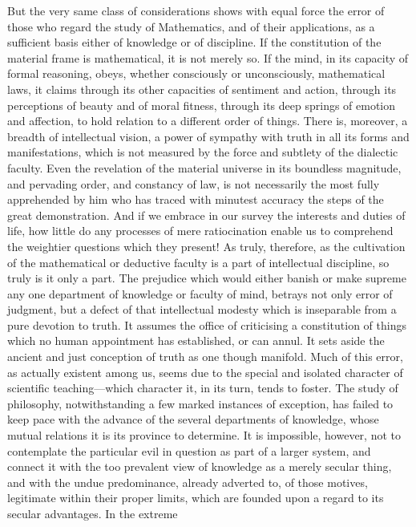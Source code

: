 \documentclass[oneside]{book}
\begin{document}
But the very same class of considerations shows with equal
force the error of those who regard the study of Mathematics,
and of their applications, as a sufficient basis either of knowledge
or of discipline. If the constitution of the material frame is mathematical, it is not merely so. If the mind, in its capacity of
formal reasoning, obeys, whether consciously or unconsciously,
mathematical laws, it claims through its other capacities of sentiment and action, through its perceptions of beauty and of
moral fitness, through its deep springs of emotion and affection,
to hold relation to a different order of things. There is, moreover, a breadth of intellectual vision, a power of sympathy with
truth in all its forms and manifestations, which is not measured
by the force and subtlety of the dialectic faculty. Even the
revelation of the material universe in its boundless magnitude,
and pervading order, and constancy of law, is not necessarily the
most fully apprehended by him who has traced with minutest
accuracy the steps of the great demonstration. And if we embrace in our survey the interests and duties of life, how little do
any processes of mere ratiocination enable us to comprehend the
weightier questions which they present! As truly, therefore, as
the cultivation of the mathematical or deductive faculty is a part
of intellectual discipline, so truly is it only a part. The prejudice which would either banish or make supreme any one
department of knowledge or faculty of mind, betrays not only
error of judgment, but a defect of that intellectual modesty
which is inseparable from a pure devotion to truth. It assumes
the office of criticising a constitution of things which no human
appointment has established, or can annul. It sets aside the
ancient and just conception of truth as one though manifold.
Much of this error, as actually existent among us, seems due
to the special and isolated character of scientific teaching---which character it, in its turn, tends to foster. The study of
philosophy, notwithstanding a few marked instances of exception,
has failed to keep pace with the advance of the several departments
of knowledge, whose mutual relations it is its province to
determine. It is impossible, however, not to contemplate the
particular evil in question as part of a larger system, and connect
it with the too prevalent view of knowledge as a merely secular
thing, and with the undue predominance, already adverted to, of
those motives, legitimate within their proper limits, which are
founded upon a regard to its secular advantages. In the extreme
\end{document}
